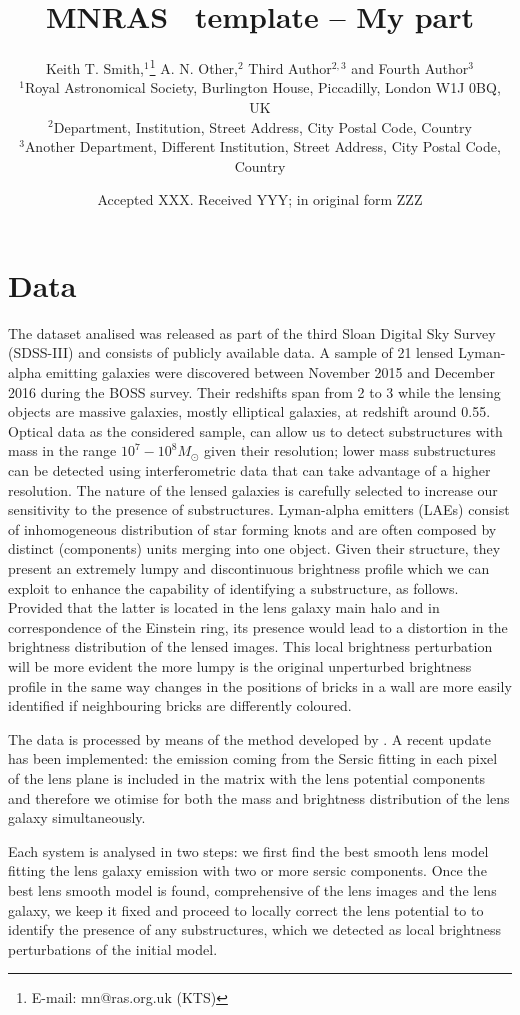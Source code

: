 \documentclass[a4paper,fleqn,usenatbib]{mnras}
\title[Short title, max. 45 characters]{MNRAS \LaTeXe\ template -- My part}
\author[K. T. Smith et al.]{
Keith T. Smith,$^{1}$\thanks{E-mail: mn@ras.org.uk (KTS)}
A. N. Other,$^{2}$
Third Author$^{2,3}$
and Fourth Author$^{3}$
\\
$^{1}$Royal Astronomical Society, Burlington House, Piccadilly, London W1J 0BQ, UK\\
$^{2}$Department, Institution, Street Address, City Postal Code, Country\\
$^{3}$Another Department, Different Institution, Street Address, City Postal Code, Country
}
\date{Accepted XXX. Received YYY; in original form ZZZ}
\begin{document}
\label{firstpage}
\pagerange{\pageref{firstpage}--\pageref{lastpage}}
\maketitle



\section{Data}
The dataset analised was released as part of the third Sloan Digital Sky Survey (SDSS-III) and consists of publicly available data. A sample of 21 lensed Lyman-alpha emitting galaxies were discovered between November 2015 and December 2016 during the BOSS survey. Their redshifts span from 2 to 3 while the lensing objects are massive galaxies, mostly elliptical galaxies, at redshift around 0.55.
Optical data as the considered sample, can allow us to detect substructures with mass in the range $10^7 - 10^8 M_{\odot}$ given their resolution; lower mass substructures can be detected using interferometric data that can take advantage of a higher resolution.
The nature of the lensed galaxies is carefully selected to increase our sensitivity to the presence of substructures. Lyman-alpha emitters (LAEs) consist of inhomogeneous distribution of star forming knots and are often composed by distinct (components) units merging into one object. Given their structure, they present an extremely lumpy and discontinuous brightness profile which we can exploit to enhance the capability of identifying a substructure, as follows. Provided that the latter is located in the lens galaxy main halo and in correspondence of the Einstein ring, its presence would lead to a distortion in the brightness distribution of the lensed images. This local brightness perturbation will be more evident the more lumpy is the original unperturbed brightness profile in the same way changes in the positions of bricks in a wall are more easily identified if neighbouring bricks are differently coloured.

The data is processed by means of the method developed by \citet{method}. A recent update has been implemented: the emission coming from the Sersic fitting in each pixel of the lens plane is included in the matrix with the lens potential components and therefore we otimise for both the mass and brightness distribution of the lens galaxy simultaneously.

Each system is analysed in two steps: we first find the best smooth lens model fitting the lens galaxy emission with two or more sersic components. Once the best lens smooth model is found, comprehensive of the lens images and the lens galaxy, we keep it fixed and proceed to locally correct the lens potential to to identify the presence of any substructures, which we detected as local brightness perturbations of the initial model.
\end{document}
